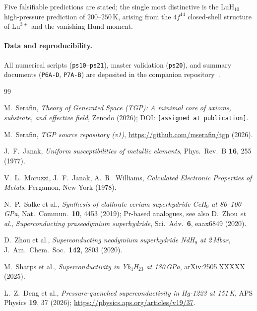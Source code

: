 \documentclass[11pt,a4paper]{article}
\begin{document}
Five falsifiable predictions are stated; the single most distinctive is
the LuH$_{10}$ high-pressure prediction of $200\text{--}250$\,K, arising
from the $4f^{14}$ closed-shell structure of $\mathrm{Lu}^{3+}$ and the
vanishing Hund moment.

\paragraph{Data and reproducibility.}
All numerical scripts (\texttt{ps10}--\texttt{ps21}), master validation
(\texttt{ps20}), and summary documents (\texttt{P6A-D}, \texttt{P7A-B})
are deposited in the companion repository~\cite{TGP-repo}.

\begin{thebibliography}{99}

M.~Serafin,
\emph{Theory of Generated Space (TGP): A minimal core of axioms,
substrate, and effective field},
Zenodo (2026); DOI: \texttt{[assigned at publication]}.

M.~Serafin,
\emph{TGP source repository (v1)},
\url{https://github.com/mserafin/tgp} (2026).

J.~F.~Janak,
\emph{Uniform susceptibilities of metallic elements},
Phys.\ Rev.\ B \textbf{16}, 255 (1977).

V.~L.~Moruzzi, J.~F.~Janak, A.~R.~Williams,
\emph{Calculated Electronic Properties of Metals},
Pergamon, New York (1978).

N.~P.~Salke et al.,
\emph{Synthesis of clathrate cerium superhydride CeH$_{9}$ at 80--100\,GPa},
Nat.\ Commun.\ \textbf{10}, 4453 (2019);
Pr-based analogues, see also
D.~Zhou \emph{et al.}, \emph{Superconducting praseodymium superhydride},
Sci.\ Adv.\ \textbf{6}, eaax6849 (2020).

D.~Zhou et al.,
\emph{Superconducting neodymium superhydride NdH$_{9}$ at 2\,Mbar},
J.\ Am.\ Chem.\ Soc.\ \textbf{142}, 2803 (2020).

M.~Sharps et al.,
\emph{Superconductivity in Yb$_{4}$H$_{23}$ at 180\,GPa},
arXiv:2505.XXXXX (2025).

L.~Z.~Deng et al.,
\emph{Pressure-quenched superconductivity in Hg-1223 at 151\,K},
APS Physics \textbf{19}, 37 (2026);
\url{https://physics.aps.org/articles/v19/37}.

\end{thebibliography}
\end{document}
